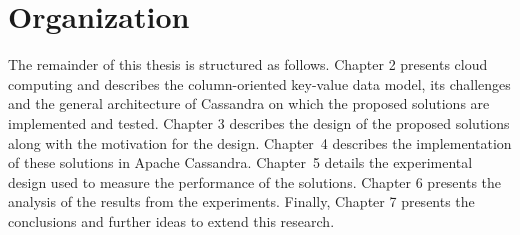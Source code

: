 \section{Organization} 

The remainder of this thesis is structured as follows.
Chapter 2 presents cloud computing and describes the column-oriented key-value
data model, its challenges and the general architecture of Cassandra on which
the proposed solutions are implemented and tested.
Chapter 3 describes the design of the proposed solutions along with the
motivation for the design.
Chapter~4 describes the implementation of these solutions in Apache Cassandra.
Chapter~5 details the experimental design used to  measure the performance of
the solutions.
Chapter 6 presents the analysis of the results from the experiments.
Finally, Chapter 7  presents the conclusions and further ideas to extend this
research.
